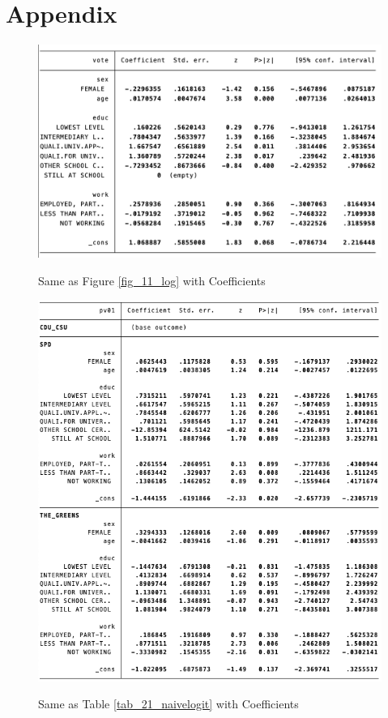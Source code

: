 \newpage
\appendix
\section{Appendix}
\setcounter{figure}{0}    
\renewcommand\thefigure{\thesection\arabic{figure}}  

\begin{figure}[!htb]
    \caption{Same as Figure \ref{fig_11_log} with Coefficients}
    \includegraphics[width=13cm]{figs_app/a1_logit-coefs}
    \label{fig_a1_log_coefs}
\end{figure}
\begin{figure}[!htb]
    \caption{Same as Table \ref{tab_21_naivelogit} with Coefficients}
    \includegraphics[width=13cm]{figs_app/a2_multi1-coefs}
    \label{fig_a2_multi1_coefs}
\end{figure}